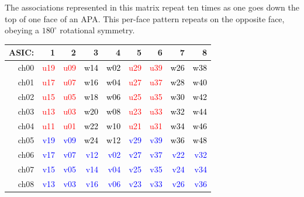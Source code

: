\documentclass[pdftex,12pt,letter]{article}
\begin{document}
The associations represented in this matrix repeat ten times as one
goes down the top of one face of an APA.  This per-face pattern
repeats on the opposite face, obeying a $180^\circ$ rotational
symmetry.

\begin{table}[htp]
  \label{tab:wirechmap}
  \centering

\begin{tabular}{r|rrrrrrrr}
\hline
ASIC:&1&2&3&4&5&6&7&8\\
\hline
ch00 & \textcolor{red}{u19} & \textcolor{red}{u09} & \textcolor{black}{w14} & \textcolor{black}{w02} & \textcolor{red}{u29} & \textcolor{red}{u39} & \textcolor{black}{w26} & \textcolor{black}{w38}\\
ch01 & \textcolor{red}{u17} & \textcolor{red}{u07} & \textcolor{black}{w16} & \textcolor{black}{w04} & \textcolor{red}{u27} & \textcolor{red}{u37} & \textcolor{black}{w28} & \textcolor{black}{w40}\\
ch02 & \textcolor{red}{u15} & \textcolor{red}{u05} & \textcolor{black}{w18} & \textcolor{black}{w06} & \textcolor{red}{u25} & \textcolor{red}{u35} & \textcolor{black}{w30} & \textcolor{black}{w42}\\
ch03 & \textcolor{red}{u13} & \textcolor{red}{u03} & \textcolor{black}{w20} & \textcolor{black}{w08} & \textcolor{red}{u23} & \textcolor{red}{u33} & \textcolor{black}{w32} & \textcolor{black}{w44}\\
ch04 & \textcolor{red}{u11} & \textcolor{red}{u01} & \textcolor{black}{w22} & \textcolor{black}{w10} & \textcolor{red}{u21} & \textcolor{red}{u31} & \textcolor{black}{w34} & \textcolor{black}{w46}\\
ch05 & \textcolor{blue}{v19} & \textcolor{blue}{v09} & \textcolor{black}{w24} & \textcolor{black}{w12} & \textcolor{blue}{v29} & \textcolor{blue}{v39} & \textcolor{black}{w36} & \textcolor{black}{w48}\\
ch06 & \textcolor{blue}{v17} & \textcolor{blue}{v07} & \textcolor{blue}{v12} & \textcolor{blue}{v02} & \textcolor{blue}{v27} & \textcolor{blue}{v37} & \textcolor{blue}{v22} & \textcolor{blue}{v32}\\
ch07 & \textcolor{blue}{v15} & \textcolor{blue}{v05} & \textcolor{blue}{v14} & \textcolor{blue}{v04} & \textcolor{blue}{v25} & \textcolor{blue}{v35} & \textcolor{blue}{v24} & \textcolor{blue}{v34}\\
ch08 & \textcolor{blue}{v13} & \textcolor{blue}{v03} & \textcolor{blue}{v16} & \textcolor{blue}{v06} & \textcolor{blue}{v23} & \textcolor{blue}{v33} & \textcolor{blue}{v26} & \textcolor{blue}{v36}\\

\end{tabular}
\end{table}
\end{document}
